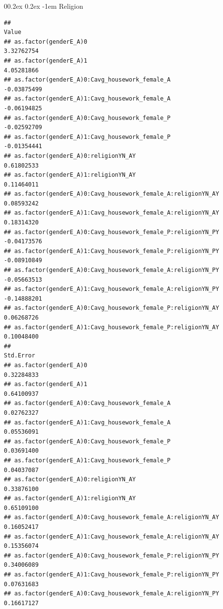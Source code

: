 \documentclass[
  man,floatsintext]{apa6}
\makeatletter
\let\oldparagraph\paragraph
\renewcommand{\paragraph}[1]{\oldparagraph{#1}\mbox{}}
\renewcommand{\paragraph}{\@startsection{paragraph}{4}{\parindent}%
  {0\baselineskip \@plus 0.2ex \@minus 0.2ex}%
  {-1em}%
  {\normalfont\normalsize\bfseries\itshape\typesectitle}}
\makeatother
\begin{document}
\hypertarget{religion}{%
\paragraph{Religion}\label{religion}}

\begin{verbatim}
##                                                                   Value
## as.factor(genderE_A)0                                        3.32762754
## as.factor(genderE_A)1                                        4.05281866
## as.factor(genderE_A)0:Cavg_housework_female_A               -0.03875499
## as.factor(genderE_A)1:Cavg_housework_female_A               -0.06194825
## as.factor(genderE_A)0:Cavg_housework_female_P               -0.02592709
## as.factor(genderE_A)1:Cavg_housework_female_P               -0.01354441
## as.factor(genderE_A)0:religionYN_AY                          0.61802533
## as.factor(genderE_A)1:religionYN_AY                          0.11464011
## as.factor(genderE_A)0:Cavg_housework_female_A:religionYN_AY  0.08593242
## as.factor(genderE_A)1:Cavg_housework_female_A:religionYN_AY  0.18314320
## as.factor(genderE_A)0:Cavg_housework_female_P:religionYN_PY -0.04173576
## as.factor(genderE_A)1:Cavg_housework_female_P:religionYN_PY -0.08910849
## as.factor(genderE_A)0:Cavg_housework_female_A:religionYN_PY -0.05663513
## as.factor(genderE_A)1:Cavg_housework_female_A:religionYN_PY -0.14888201
## as.factor(genderE_A)0:Cavg_housework_female_P:religionYN_AY  0.06268726
## as.factor(genderE_A)1:Cavg_housework_female_P:religionYN_AY  0.10048400
##                                                              Std.Error
## as.factor(genderE_A)0                                       0.32284833
## as.factor(genderE_A)1                                       0.64100937
## as.factor(genderE_A)0:Cavg_housework_female_A               0.02762327
## as.factor(genderE_A)1:Cavg_housework_female_A               0.05536091
## as.factor(genderE_A)0:Cavg_housework_female_P               0.03691400
## as.factor(genderE_A)1:Cavg_housework_female_P               0.04037087
## as.factor(genderE_A)0:religionYN_AY                         0.33876100
## as.factor(genderE_A)1:religionYN_AY                         0.65109100
## as.factor(genderE_A)0:Cavg_housework_female_A:religionYN_AY 0.16052417
## as.factor(genderE_A)1:Cavg_housework_female_A:religionYN_AY 0.15356074
## as.factor(genderE_A)0:Cavg_housework_female_P:religionYN_PY 0.34006089
## as.factor(genderE_A)1:Cavg_housework_female_P:religionYN_PY 0.07631683
## as.factor(genderE_A)0:Cavg_housework_female_A:religionYN_PY 0.16617127

\end{verbatim}
\end{document}
